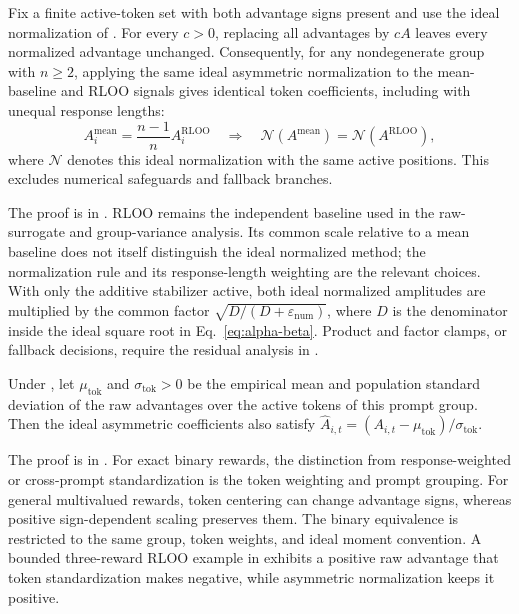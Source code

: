 \begin{proposition}
\label{prop:normalization-scale-invariance}
Fix a finite active-token set with both advantage signs present and use the
ideal normalization of . For every $c>0$, replacing
all advantages by $cA$ leaves every normalized advantage unchanged.
Consequently, for any nondegenerate group with $n\ge2$, applying the same ideal asymmetric
normalization to the mean-baseline and RLOO signals gives identical token
coefficients, including with unequal response lengths:
\begin{equation}
    A_i^{\mathrm{mean}}=\frac{n-1}{n}A_i^{\mathrm{RLOO}}
    \quad\Longrightarrow\quad
    \mathcal N(A^{\mathrm{mean}})=\mathcal N(A^{\mathrm{RLOO}}),
    \label{eq:normalized-baseline-equivalence}
\end{equation}
where $\mathcal N$ denotes this ideal normalization with the same active
positions. This excludes numerical safeguards and fallback branches.
\end{proposition}

The proof is in . RLOO remains the independent
baseline used in the raw-surrogate and group-variance analysis. Its common
scale relative to a mean baseline does not itself distinguish the ideal
normalized method; the normalization rule and its response-length weighting
are the relevant choices. With only the additive stabilizer active,
both ideal normalized amplitudes are multiplied by the common factor
$\sqrt{D/(D+\varepsilon_{\mathrm{num}})}$, where $D$ is the denominator
inside the ideal square root in Eq.~\eqref{eq:alpha-beta}.
Product and factor clamps, or fallback decisions, require the residual
analysis in .

\begin{corollary}
\label{cor:binary-token-standardization}
Under , let $\mu_{\mathrm{tok}}$ and
$\sigma_{\mathrm{tok}}>0$ be the empirical mean and population standard
deviation of the raw advantages over the active tokens of this prompt group.
Then the ideal asymmetric coefficients also satisfy
$\hat A_{i,t}=(A_{i,t}-\mu_{\mathrm{tok}})/\sigma_{\mathrm{tok}}$.
\end{corollary}

The proof is in . For exact binary rewards,
the distinction from response-weighted or cross-prompt standardization is
the token weighting and prompt grouping. For general multivalued rewards,
token centering can change advantage signs, whereas positive sign-dependent
scaling preserves them. The binary equivalence is restricted to the same
group, token weights, and ideal moment convention.
A bounded three-reward RLOO example in 
exhibits a positive raw advantage that token standardization makes negative,
while asymmetric normalization keeps it positive.

